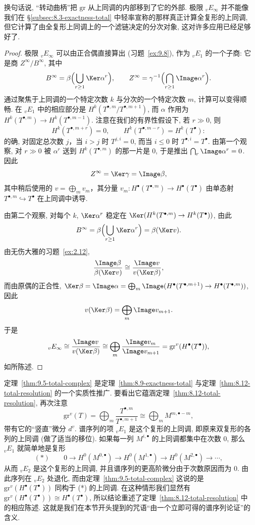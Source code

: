 换句话说, “转动曲柄”把 $\mathrm{gr}$ 从上同调的内部移到了它的外部. 极限 ${}_vE_\infty$ 并不能像我们在 \S\ref{subsec:8.3-exactness-total} 中轻率宣称的那样真正计算全复形的上同调, 但它计算了由全复形上同调上的一个滤链决定的分次对象, 这对许多应用已经足够好了.

\begin{proof}
极限 ${}_vE_\infty$ 可以由正合偶直接算出 (习题~\ref{ex:9.8}), 作为 ${}_vE_1$ 的一个子商: 它是商 $Z^\infty/B^\infty$, 其中
\[
B^\infty = \beta\Bigl(\bigcup_{r\ge 1}\Ker\alpha^r\Bigr),\qquad
Z^\infty = \gamma^{-1}\Bigl(\bigcap_{r\ge 1}\Image\alpha^r\Bigr).
\]
通过聚焦于上同调的一个特定次数 $k$ 与分次的一个特定次数 $m$, 计算可以变得顺畅. 在 ${}_vE_1$ 中的相应部分是 $H^k(T^{\bullet,m}/T^{\bullet,m+1})$, 而 $\alpha$ 作用为 $H^k(T^{\bullet,m})\to H^k(T^{\bullet,m-1})$. 注意在我们的有界性假设下, 若 $r\gg 0$, 则
\[
H^k(T^{\bullet,m+r})=0,\qquad H^k(T^{\bullet,m-r})=H^k(T^\bullet):
\]
的确, 对固定总次数 $j$，当 $i>j$ 时 $T^{j,i}=0$, 而当 $i\le 0$ 时 $T^{\bullet,i}=T^\bullet$. 由第一个观察, 对 $r\gg 0$ 被 $\alpha^r$ 送到 $H^k(T^{\bullet,m})$ 的那一片是 $0$, 于是推出 $\bigcap_r\Image\alpha^r=0$. 因此
\[
Z^\infty=\Ker\gamma=\Image\beta,
\]
其中稍后使用的 $v=\bigoplus_m v_m$，其分量 $v_m:H^\bullet(T^{\bullet,m})\to H^\bullet(T^\bullet)$ 由单态射 $T^{\bullet,m}\hookrightarrow T^\bullet$ 在上同调中诱导.

由第二个观察, 对每个 $k$, $\Ker\alpha^r$ 稳定在 $\Ker(H^k(T^{\bullet,m})\to H^k(T^\bullet))$, 由此
\[
B^\infty=\beta\Bigl(\bigcup_{r\ge 1}\Ker\alpha^r\Bigr)=\beta(\Ker v).
\]
由无伤大雅的习题~\ref{ex:2.12},
\[
\frac{\Image\beta}{\beta(\Ker v)}\cong \frac{\Image v}{v(\Ker\beta)},
\]
而由原偶的正合性, $\Ker\beta=\Image\alpha=\bigoplus_m\Image(H^\bullet(T^{\bullet,m+1})\to H^\bullet(T^{\bullet,m}))$, 因此
\[
v(\Ker\beta)=\bigoplus_m\Image v_{m+1}.
\]
于是
\[
{}_vE_\infty \cong \frac{\Image v}{v(\Ker\beta)}
\cong \bigoplus_m \frac{\Image v_m}{\Image v_{m+1}}
= \mathrm{gr}^v(H^\bullet(T^\bullet)),
\]
如所陈述.
\end{proof}

定理~\ref{thm:9.5-total-complex} 是定理~\ref{thm:8.9-exactness-total} 与定理~\ref{thm:8.12-total-resolution} 的一个实质性推广. 要看出它蕴涵定理~\ref{thm:8.12-total-resolution}, 再次注意
\[
\mathrm{gr}^v(T)=\bigoplus_m \frac{T^{\bullet,m}}{T^{\bullet,m+1}}
\cong \bigoplus_m M^{m,\bullet-m},
\]
带有它的“竖直”微分 $d^v$. 谱序列的项 ${}_vE_1$ 是这个复形的上同调, 即原来双复形的各列的上同调 (做了适当的移位). 如果每一列 $M^{i,\bullet}$ 的上同调都集中在次数 $0$, 那么 ${}_vE_1$ 就简单地是复形
\[
(*)\qquad 0\longrightarrow H^0(M^{0,\bullet})\longrightarrow H^0(M^{1,\bullet})\longrightarrow H^0(M^{2,\bullet})\longrightarrow\cdots ,
\]
从而 ${}_vE_2$ 是这个复形的上同调, 并且谱序列的更高阶微分由于次数原因而为 $0$. 由此序列在 ${}_vE_2$ 处退化, 而由定理~\ref{thm:9.5-total-complex} 这说的是 $\mathrm{gr}^v(H^\bullet(T^\bullet))$ 同构于 (*) 的上同调. 在这种情形我们显然有 $\mathrm{gr}^v(H^\bullet(T^\bullet))\cong H^\bullet(T^\bullet)$, 所以结论重述了定理~\ref{thm:8.12-total-resolution} 中的相应陈述. 这就是我们在本节开头提到的咒语“由一个立即可得的谱序列论证”的含义.

